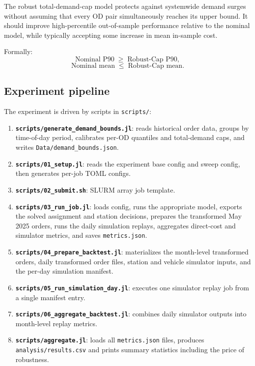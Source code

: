 \documentclass[11pt]{article}
\theoremstyle{definition}
\begin{document}
The robust total-demand-cap model protects against systemwide demand surges
without assuming that every OD pair simultaneously reaches its upper bound.  It
should improve high-percentile out-of-sample performance relative to the
nominal model, while typically accepting some increase in mean in-sample cost.

Formally:
\[
	\text{Nominal P90} \;\ge\; \text{Robust-Cap P90},
\]
\[
	\text{Nominal mean} \;\le\; \text{Robust-Cap mean}.
\]

\subsection{Experiment pipeline}

The experiment is driven by scripts in \texttt{scripts/}:

\begin{enumerate}
	\item \textbf{\texttt{scripts/generate\_demand\_bounds.jl}}: reads historical
	      order data, groups by time-of-day period, calibrates per-OD quantiles
	      and total-demand caps, and writes \texttt{Data/demand\_bounds.json}.
	\item \textbf{\texttt{scripts/01\_setup.jl}}: reads
	      the experiment base config and sweep config, then generates per-job
	      TOML configs.
	\item \textbf{\texttt{scripts/02\_submit.sh}}: SLURM array job template.
	\item \textbf{\texttt{scripts/03\_run\_job.jl}}: loads config, runs the
	      appropriate model, exports the solved assignment and station decisions,
	      prepares the transformed May 2025 orders, runs the daily simulation
	      replays, aggregates direct-cost and simulator metrics, and saves
	      \texttt{metrics.json}.
	\item \textbf{\texttt{scripts/04\_prepare\_backtest.jl}}: materializes the
	      month-level transformed orders, daily transformed order files, station
	      and vehicle simulator inputs, and the per-day simulation manifest.
	\item \textbf{\texttt{scripts/05\_run\_simulation\_day.jl}}: executes one
	      simulator replay job from a single manifest entry.
	\item \textbf{\texttt{scripts/06\_aggregate\_backtest.jl}}: combines daily
	      simulator outputs into month-level replay metrics.
	\item \textbf{\texttt{scripts/aggregate.jl}}: loads all \texttt{metrics.json}
	      files, produces \texttt{analysis/results.csv} and prints summary
	      statistics including the price of robustness.
\end{enumerate}
\end{document}
